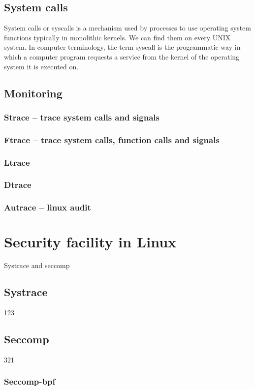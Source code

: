 \section{System calls}
System calls or syscalls is a mechanism used by processes to use operating system functions typically in monolithic kernels.
We can find them on every UNIX system.
In computer terminology, the term syscall is the programmatic way in which a computer program requests a service from the kernel of the operating system it is executed on.


\section{Monitoring}
\subsection{Strace -- trace system calls and signals}
\subsection{Ftrace -- trace system calls, function calls and signals}
\subsection{Ltrace}
\subsection{Dtrace}
\subsection{Autrace -- linux audit}

\chapter{Security facility in Linux}
Systrace and seccomp\cite{Pravidla}
\section{Systrace}
123

\section{Seccomp}
321
\subsection{Seccomp-bpf}

